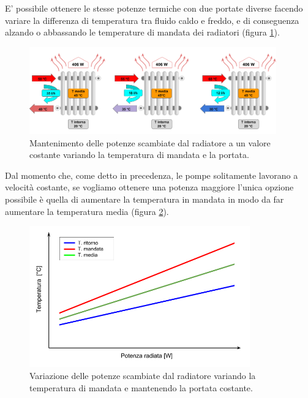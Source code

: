\documentclass[laurea,oneside,11pt]{USiena_tesiLM}
\begin{document}
E' possibile ottenere  le stesse potenze termiche con due portate diverse facendo variare la differenza di temperatura tra fluido caldo e freddo, e di conseguenza alzando o abbassando le temperature di mandata dei radiatori (figura \ref{fig:portata}). 

\begin{figure}[h]
\begin{center}
\includegraphics[width=0.95\textwidth]{figure/portata} %
\caption{Mantenimento delle potenze scambiate dal radiatore a un valore costante variando la temperatura di mandata e la portata.}
\label{fig:portata}
\end{center}
\end{figure}

Dal momento che, come detto in precedenza, le pompe solitamente lavorano a velocità costante, se vogliamo ottenere una potenza maggiore l'unica opzione possibile è quella di aumentare la temperatura in mandata in modo da far aumentare la temperatura media (figura \ref{fig:portata2}).

\begin{figure}[!ht]
\begin{center}
\includegraphics[width=0.85\textwidth]{figure/pot_radiatore} %
\caption{Variazione delle potenze scambiate dal radiatore variando la temperatura di mandata e mantenendo la portata costante.}
\label{fig:portata2}
\end{center}
\end{figure}
\end{document}
